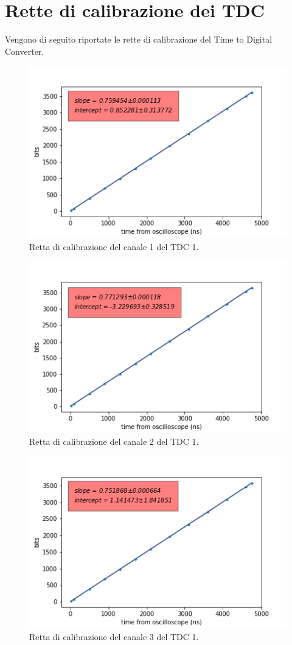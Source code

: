 \appendix                               %
\chapter{Rette di calibrazione dei TDC}               %
Vengono di seguito riportate le rette di calibrazione del Time to Digital Converter.

\begin{figure}[H]
  \centering
  \includegraphics[width=.8\textwidth]{plots/tdc11.png}
  \caption{Retta di calibrazione del canale 1 del TDC 1.}
  \label{fig:tdc11}
\end{figure}

\begin{figure}[H]
  \centering
  \includegraphics[width=.8\textwidth]{plots/tdc12.png}
  \caption{Retta di calibrazione del canale 2 del TDC 1.}
  \label{fig:tdc12}
\end{figure}

\begin{figure}[H]
  \centering
  \includegraphics[width=.8\textwidth]{plots/tdc13.png}
  \caption{Retta di calibrazione del canale 3 del TDC 1.}
  \label{fig:tdc13}
\end{figure}

